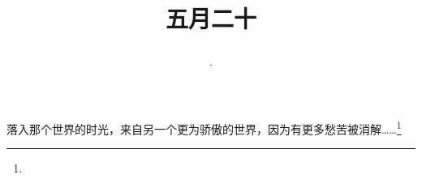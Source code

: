 \title{\date[d=25,m=6,y=2024][year:cn-y,年,month:cn,day:cn,日,·,weekday]·五月二十 }
落入那个世界的时光，来自另一个更为骄傲的世界，因为有更多愁苦被消解……\footnote{ }

